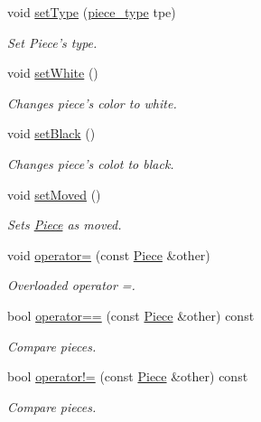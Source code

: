 \begin{DoxyCompactItemize}
void \hyperlink{classChEngn_1_1Piece_ab176e376bb5ac634914c45e6101471d9}{setType} (\hyperlink{namespaceChEngn_a2a35c185f259757a78e937575b8ed483}{piece\_\-type} tpe)
\begin{DoxyCompactList}\small\item\em Set Piece's type. \item\end{DoxyCompactList}\item 
\hypertarget{classChEngn_1_1Piece_a93b4da88b5b3bd52c025895ea9296b42}{
void \hyperlink{classChEngn_1_1Piece_a93b4da88b5b3bd52c025895ea9296b42}{setWhite} ()}
\label{classChEngn_1_1Piece_a93b4da88b5b3bd52c025895ea9296b42}

\begin{DoxyCompactList}\small\item\em Changes piece's color to white. \item\end{DoxyCompactList}\item 
\hypertarget{classChEngn_1_1Piece_a28f4d2b27bebe4cf45a9a44aeaaf1f93}{
void \hyperlink{classChEngn_1_1Piece_a28f4d2b27bebe4cf45a9a44aeaaf1f93}{setBlack} ()}
\label{classChEngn_1_1Piece_a28f4d2b27bebe4cf45a9a44aeaaf1f93}

\begin{DoxyCompactList}\small\item\em Changes piece's colot to black. \item\end{DoxyCompactList}\item 
void \hyperlink{classChEngn_1_1Piece_a49e68ef199415d60ea2a394501a52f5a}{setMoved} ()
\begin{DoxyCompactList}\small\item\em Sets \hyperlink{classChEngn_1_1Piece}{Piece} as moved. \item\end{DoxyCompactList}\item 
void \hyperlink{classChEngn_1_1Piece_a8142dd8313cf7ea1ded23af47fc45532}{operator=} (const \hyperlink{classChEngn_1_1Piece}{Piece} \&other)
\begin{DoxyCompactList}\small\item\em Overloaded operator =. \item\end{DoxyCompactList}\item 
bool \hyperlink{classChEngn_1_1Piece_a6b6b6e455671ac4f3f9996ef31602a13}{operator==} (const \hyperlink{classChEngn_1_1Piece}{Piece} \&other) const 
\begin{DoxyCompactList}\small\item\em Compare pieces. \item\end{DoxyCompactList}\item 
bool \hyperlink{classChEngn_1_1Piece_a05d046bcdb5a94a69ea0a7f335c1a7f6}{operator!=} (const \hyperlink{classChEngn_1_1Piece}{Piece} \&other) const 
\begin{DoxyCompactList}\small\item\em Compare pieces. \item\end{DoxyCompactList}\end{DoxyCompactItemize}
